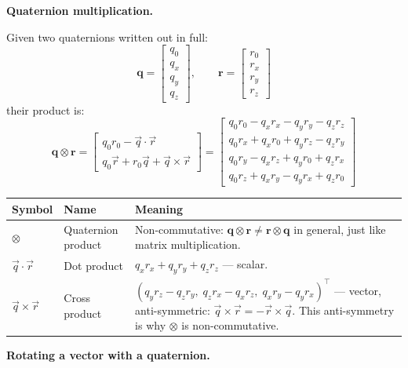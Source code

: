 \documentclass[12pt, a4paper]{article}
\begin{document}
\textbf{Quaternion multiplication.}

Given two quaternions written out in full:
\[
  \mathbf{q}
  = \begin{bmatrix} q_0 \\ q_x \\ q_y \\ q_z \end{bmatrix},
  \qquad
  \mathbf{r}
  = \begin{bmatrix} r_0 \\ r_x \\ r_y \\ r_z \end{bmatrix}
\]
their product is:
\[
  \mathbf{q} \otimes \mathbf{r}
  = \begin{bmatrix}
      q_0 r_0 - \vec{q}\cdot\vec{r} \\
      q_0\vec{r} + r_0\vec{q} + \vec{q}\times\vec{r}
    \end{bmatrix}
  = \begin{bmatrix}
      q_0 r_0 - q_x r_x - q_y r_y - q_z r_z \\
      q_0 r_x + q_x r_0 + q_y r_z - q_z r_y \\
      q_0 r_y - q_x r_z + q_y r_0 + q_z r_x \\
      q_0 r_z + q_x r_y - q_y r_x + q_z r_0
    \end{bmatrix}
\]

\begin{center}
\begin{tabular}{@{} l p{3.0cm} p{7.5cm} @{}}
  \toprule
  Symbol & Name & Meaning \\
  \midrule
  $\otimes$ & Quaternion product &
    Non-commutative: $\mathbf{q}\otimes\mathbf{r} \neq
    \mathbf{r}\otimes\mathbf{q}$ in general, just like matrix
    multiplication. \\[3pt]
  $\vec{q}\cdot\vec{r}$ & Dot product &
    $q_x r_x + q_y r_y + q_z r_z$ --- scalar. \\[3pt]
  $\vec{q}\times\vec{r}$ & Cross product &
    $(q_y r_z - q_z r_y,\; q_z r_x - q_x r_z,\; q_x r_y - q_y r_x)^\top$
    --- vector, anti-symmetric: $\vec{q}\times\vec{r} = -\vec{r}\times
    \vec{q}$.
    This anti-symmetry is why $\otimes$ is non-commutative. \\
  \bottomrule
\end{tabular}
\end{center}

\textbf{Rotating a vector with a quaternion.}
\end{document}
